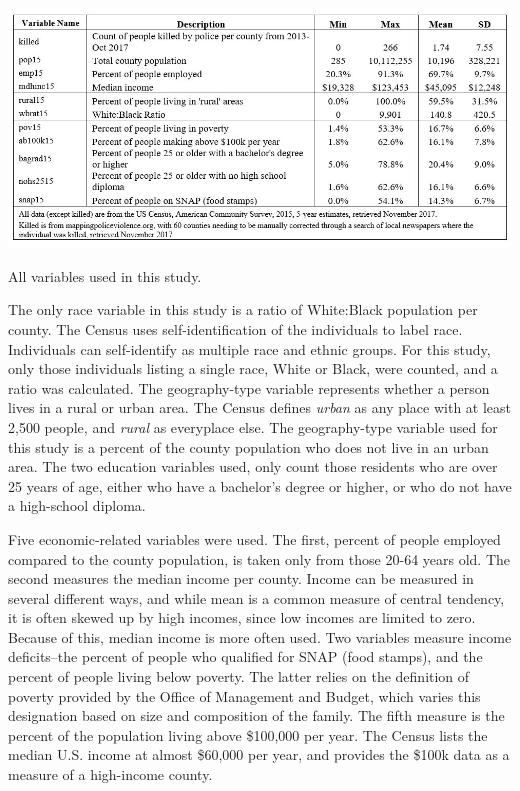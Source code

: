 \documentclass[sigconf]{acmart}
\begin{document}
\begin{table}
\includegraphics[width=1.0\textwidth]{images/table1.jpg}
\caption{All variables used in this study.}
\end{table}

The only race variable in this study is a ratio of White:Black population per county.  The Census uses self-identification of the individuals to label race.  Individuals can self-identify as multiple race and ethnic groups.  For this study, only those individuals listing a single race, White or Black, were counted, and a ratio was calculated.  The geography-type variable represents whether a person lives in a rural or urban area.  The Census defines {\em urban} as any place with at least 2,500 people, and {\em rural} as everyplace else.  The geography-type variable used for this study is a percent of the county population who does not live in an urban area.  The two education variables used, only count those residents who are over 25 years of age, either who have a bachelor's degree or higher, or who do not have a high-school diploma.  

Five economic-related variables were used.  The first, percent of people employed compared to the county population, is taken only from those 20-64 years old.  The second measures the median income per county.  Income can be measured in several different ways, and while mean is a common measure of central tendency, it is often skewed up by high incomes, since low incomes are limited to zero.  Because of this, median income is more often used.  Two variables measure income deficits--the percent of people who  qualified for SNAP (food stamps), and the percent of people living below poverty.  The latter relies on the definition of poverty provided by the Office of Management and Budget, which varies this designation based on size and composition of the family.  The fifth measure is the percent of the population living above \$100,000  per year. The Census lists the median U.S. income at almost \$60,000 per year, and provides the \$100k data as a measure of a high-income county.
\end{document}
